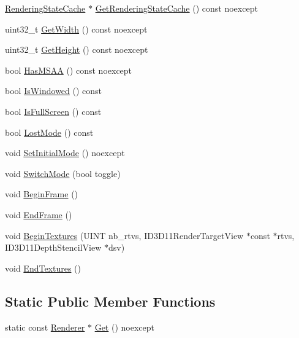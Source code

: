 \begin{DoxyCompactItemize}
\item 
\hyperlink{structmage_1_1_rendering_state_cache}{Rendering\+State\+Cache} $\ast$ \hyperlink{classmage_1_1_renderer_a5e48da6152df0ddfa52c079f77ee6873}{Get\+Rendering\+State\+Cache} () const noexcept
\item 
uint32\+\_\+t \hyperlink{classmage_1_1_renderer_a140938e7d5f576163d39ce249ebda99f}{Get\+Width} () const noexcept
\item 
uint32\+\_\+t \hyperlink{classmage_1_1_renderer_adc6940516d809d1916c627d6ce3837fe}{Get\+Height} () const noexcept
\item 
bool \hyperlink{classmage_1_1_renderer_a2ed9e9e39f01fa58769edd82ee1adcf8}{Has\+M\+S\+AA} () const noexcept
\item 
bool \hyperlink{classmage_1_1_renderer_a1de1804c1eedae7dc12435a520a10b9c}{Is\+Windowed} () const
\item 
bool \hyperlink{classmage_1_1_renderer_a5ae3220e19c68f47a8e4d55e3ced4694}{Is\+Full\+Screen} () const
\item 
bool \hyperlink{classmage_1_1_renderer_afdde83a1e2bc9288f000fb2575c525d0}{Lost\+Mode} () const
\item 
void \hyperlink{classmage_1_1_renderer_aff4e08af2ab697c53f1ede6546a86d19}{Set\+Initial\+Mode} () noexcept
\item 
void \hyperlink{classmage_1_1_renderer_a9004ab608659188900c808eacb5f873c}{Switch\+Mode} (bool toggle)
\item 
void \hyperlink{classmage_1_1_renderer_ac9adf3be8c7201e4df8c5f9e049dc43d}{Begin\+Frame} ()
\item 
void \hyperlink{classmage_1_1_renderer_a38be3325e99a447340a048db19e6cf07}{End\+Frame} ()
\item 
void \hyperlink{classmage_1_1_renderer_a2ffbc529a9f57ebd724273bbf17413fc}{Begin\+Textures} (U\+I\+NT nb\+\_\+rtvs, I\+D3\+D11\+Render\+Target\+View $\ast$const $\ast$rtvs, I\+D3\+D11\+Depth\+Stencil\+View $\ast$dsv)
\item 
void \hyperlink{classmage_1_1_renderer_a80cfd903143b94348bc2c0c841831ff3}{End\+Textures} ()
\end{DoxyCompactItemize}
\subsection*{Static Public Member Functions}
\begin{DoxyCompactItemize}
\item 
static const \hyperlink{classmage_1_1_renderer}{Renderer} $\ast$ \hyperlink{classmage_1_1_renderer_a84ad465ae4ecfa2c0e9334cadb82d269}{Get} () noexcept
\end{DoxyCompactItemize}
